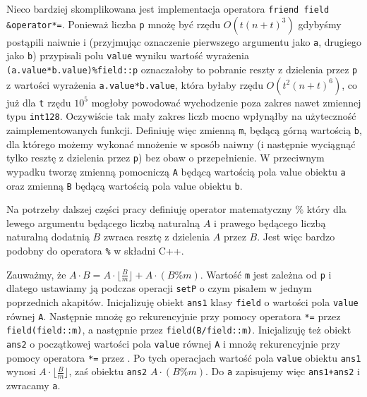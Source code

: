 \documentclass{article}
\begin{document}
Nieco bardziej skomplikowana jest implementacja operatora \texttt{friend field \&operator*=}. Ponieważ liczba 
\texttt{p} mnożę być rzędu $O(t(n+t)^3)$ gdybyśmy postąpili naiwnie i (przyjmując 
oznaczenie pierwszego argumentu jako \texttt{a}, drugiego jako \texttt{b}) 
przypisali polu \texttt{value} wyniku wartość wyrażenia
\newline \texttt{(a.value*b.value)\%field::p} oznaczałoby to pobranie reszty z dzielenia przez \texttt{p} z 
wartości wyrażenia
\texttt{a.value*b.value}, która 
byłaby rzędu $O(t^2(n+t)^6)$, co już dla \texttt{t} rzędu $10^5$ mogłoby powodować 
wychodzenie poza zakres nawet zmiennej typu 
\texttt{\textunderscore \textunderscore int128}. 
Oczywiście tak mały zakres liczb mocno wpłynąłby na użyteczność
zaimplementowanych funkcji. Definiuję więc zmienną \texttt{m}, będącą 
górną wartością \texttt{b}, dla którego możemy wykonać mnożenie w sposób naiwny 
(i następnie wyciągnąć tylko resztę z dzielenia przez \texttt{p}) bez obaw o przepełnienie.
W przeciwnym wypadku tworzę zmienną pomocniczą \texttt{A} będącą wartością pola value
obiektu \texttt{a} oraz zmienną \texttt{B} będącą wartością pola value obiektu 
\texttt{b}.
\begin{tcolorbox}
\begin{center}
    Na potrzeby dalszej części pracy definiuję operator matematyczny $\%$ który dla lewego 
    argumentu będącego liczbą naturalną $A$ i prawego będącego liczbą naturalną dodatnią 
    $B$ zwraca resztę z dzielenia $A$ przez $B$. Jest więc bardzo podobny do operatora 
    \texttt{\%} w składni C++.
\end{center}    
\end{tcolorbox}
Zauważmy, że $A \cdot B = A \cdot \lfloor \frac{B}{m} \rfloor  + A \cdot (B \% m)$. 
Wartość \texttt{m} jest zależna od \texttt{p} i dlatego ustawiamy ją podczas operacji 
\texttt{setP} o czym pisałem w 
jednym poprzednich akapitów. Inicjalizuję obiekt \texttt{ans1} klasy \texttt{field} o wartości pola \texttt{value} równej \texttt{A}.
Następnie mnożę go rekurencyjnie przy pomocy operatora \texttt{*=} przez \texttt{field(field::m)}, a następnie przez 
\texttt{field(B/field::m)}. Inicjalizuję też obiekt \texttt{ans2} o początkowej wartości pola \texttt{value}
równej \texttt{A} i mnożę rekurencyjnie przy pomocy operatora \texttt{*=} przez . 
Po tych operacjach wartość pola \texttt{value} obiektu \texttt{ans1} wynosi $A \cdot \lfloor \frac{B}{m} \rfloor$, zaś 
obiektu \texttt{ans2} $A \cdot (B \% m)$. Do \texttt{a} zapisujemy więc \texttt{ans1+ans2} i zwracamy \texttt{a}.
\end{document}
